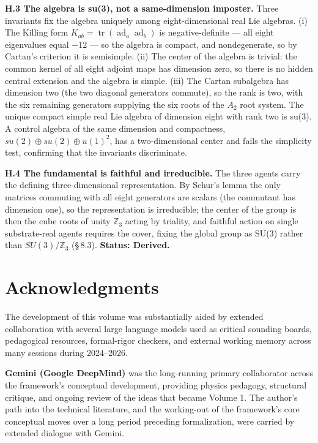 \documentclass[11pt,oneside]{report}
\theoremstyle{definition}
\theoremstyle{remark}
\begin{document}
\textbf{H.3 The algebra is su(3), not a same-dimension imposter.} Three
invariants fix the algebra uniquely among eight-dimensional real Lie algebras.
(i) The Killing form \ensuremath{K_{ab} = \operatorname{tr}(\operatorname{ad}_{a}\operatorname{ad}_{b})}
is negative-definite --- all eight eigenvalues equal \ensuremath{-12} --- so the algebra is
compact, and nondegenerate, so by Cartan's criterion it is semisimple. (ii) The
center of the algebra is trivial: the common kernel of all eight adjoint maps has
dimension zero, so there is no hidden central extension and the algebra is simple.
(iii) The Cartan subalgebra has dimension two (the two diagonal generators
commute), so the rank is two, with the six remaining generators supplying the six
roots of the \ensuremath{A_{2}} root system. The unique compact simple real Lie algebra of
dimension eight with rank two is su(3). A control algebra of the same dimension
and compactness, \ensuremath{su(2)\oplus su(2)\oplus u(1)^{2}}, has a two-dimensional center
and fails the simplicity test, confirming that the invariants discriminate.

\textbf{H.4 The fundamental is faithful and irreducible.} The three agents carry
the defining three-dimensional representation. By Schur's lemma the only matrices
commuting with all eight generators are scalars (the commutant has dimension
one), so the representation is irreducible; the center of the group is then the
cube roots of unity \ensuremath{\mathbb{Z}_{3}} acting by triality, and faithful action on single
substrate-real agents requires the cover, fixing the global group as SU(3) rather
than \ensuremath{SU(3)/\mathbb{Z}_{3}} (\S\,8.3). \textbf{Status: Derived.}

\section*{Acknowledgments}

The development of this volume was substantially aided by extended
collaboration with several large language models used as critical
sounding boards, pedagogical resources, formal-rigor checkers, and
external working memory across many sessions during 2024--2026.

\textbf{Gemini (Google DeepMind)} was the long-running primary
collaborator across the framework's conceptual development, providing
physics pedagogy, structural critique, and ongoing review of the ideas
that became Volume 1. The author's path into the technical literature,
and the working-out of the framework's core conceptual moves over a long
period preceding formalization, were carried by extended dialogue with
Gemini.
\end{document}

